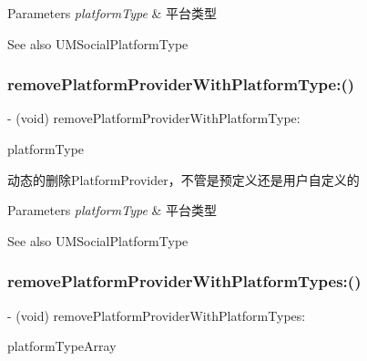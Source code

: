 \begin{DoxyParams}{Parameters}
{\em platform\+Type} & 平台类型 \\
\hline
\end{DoxyParams}
\begin{DoxySeeAlso}{See also}
U\+M\+Social\+Platform\+Type 
\end{DoxySeeAlso}
\mbox{\label{interface_u_m_social_manager_a21a09933474869bd2a402c47c11e6293}} 
\subsubsection{\texorpdfstring{remove\+Platform\+Provider\+With\+Platform\+Type\+:()}{removePlatformProviderWithPlatformType:()}\hspace{0.1cm}{\footnotesize\ttfamily [2/2]}}
{\footnotesize\ttfamily -\/ (void) remove\+Platform\+Provider\+With\+Platform\+Type\+: \begin{DoxyParamCaption}\item[{(U\+M\+Social\+Platform\+Type)}]{platform\+Type }\end{DoxyParamCaption}}

动态的删除\+Platform\+Provider，不管是预定义还是用户自定义的


\begin{DoxyParams}{Parameters}
{\em platform\+Type} & 平台类型 \\
\hline
\end{DoxyParams}
\begin{DoxySeeAlso}{See also}
U\+M\+Social\+Platform\+Type 
\end{DoxySeeAlso}
\mbox{\label{interface_u_m_social_manager_a819b388a668c5ab8e5674d3ff2e9f338}} 
\subsubsection{\texorpdfstring{remove\+Platform\+Provider\+With\+Platform\+Types\+:()}{removePlatformProviderWithPlatformTypes:()}\hspace{0.1cm}{\footnotesize\ttfamily [1/2]}}
{\footnotesize\ttfamily -\/ (void) remove\+Platform\+Provider\+With\+Platform\+Types\+: \begin{DoxyParamCaption}\item[{(N\+S\+Array $\ast$)}]{platform\+Type\+Array }\end{DoxyParamCaption}}

